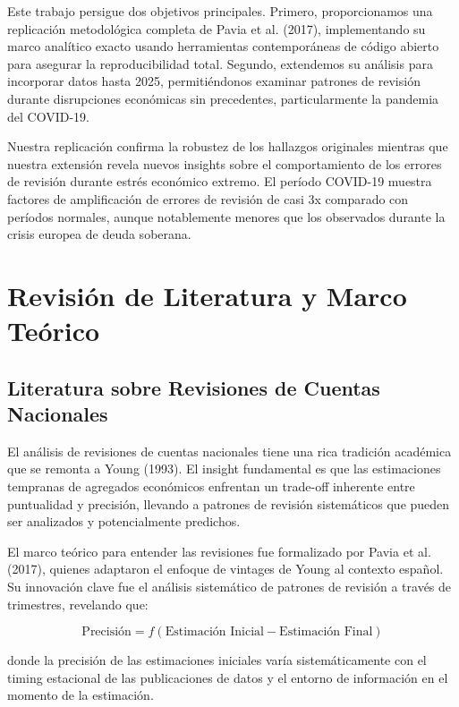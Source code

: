 \documentclass[12pt,a4paper]{article}
\begin{document}
Este trabajo persigue dos objetivos principales. Primero, proporcionamos una replicación metodológica completa de Pavia et al. (2017), implementando su marco analítico exacto usando herramientas contemporáneas de código abierto para asegurar la reproducibilidad total. Segundo, extendemos su análisis para incorporar datos hasta 2025, permitiéndonos examinar patrones de revisión durante disrupciones económicas sin precedentes, particularmente la pandemia del COVID-19.

Nuestra replicación confirma la robustez de los hallazgos originales mientras que nuestra extensión revela nuevos insights sobre el comportamiento de los errores de revisión durante estrés económico extremo. El período COVID-19 muestra factores de amplificación de errores de revisión de casi 3x comparado con períodos normales, aunque notablemente menores que los observados durante la crisis europea de deuda soberana.

\section{Revisión de Literatura y Marco Teórico}

\subsection{Literatura sobre Revisiones de Cuentas Nacionales}

El análisis de revisiones de cuentas nacionales tiene una rica tradición académica que se remonta a Young (1993). El insight fundamental es que las estimaciones tempranas de agregados económicos enfrentan un trade-off inherente entre puntualidad y precisión, llevando a patrones de revisión sistemáticos que pueden ser analizados y potencialmente predichos.

El marco teórico para entender las revisiones fue formalizado por Pavia et al. (2017), quienes adaptaron el enfoque de vintages de Young al contexto español. Su innovación clave fue el análisis sistemático de patrones de revisión a través de trimestres, revelando que:

\begin{equation}
\text{Precisión} = f(\text{Estimación Inicial} - \text{Estimación Final})
\end{equation}

donde la precisión de las estimaciones iniciales varía sistemáticamente con el timing estacional de las publicaciones de datos y el entorno de información en el momento de la estimación.
\end{document}

